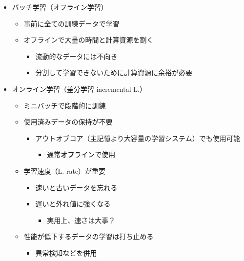\begin{itemize}
\tightlist
\item
  バッチ学習（オフライン学習）

  \begin{itemize}
  \tightlist
  \item
    事前に全ての訓練データで学習
  \item
    オフラインで大量の時間と計算資源を割く

    \begin{itemize}
    \tightlist
    \item
      流動的なデータには不向き
    \item
      分割して学習できないために計算資源に余裕が必要
    \end{itemize}
  \end{itemize}
\item
  オンライン学習（差分学習 incremental L.）

  \begin{itemize}
  \tightlist
  \item
    ミニバッチで段階的に訓練
  \item
    使用済みデータの保持が不要

    \begin{itemize}
    \tightlist
    \item
      アウトオブコア（主記憶より大容量の学習システム）でも使用可能

      \begin{itemize}
      \tightlist
      \item
        通常\textbf{オフ}ラインで使用
      \end{itemize}
    \end{itemize}
  \item
    学習速度（L. rate）が重要

    \begin{itemize}
    \tightlist
    \item
      速いと古いデータを忘れる
    \item
      遅いと外れ値に強くなる

      \begin{itemize}
      \tightlist
      \item
        実用上、速さは大事？
      \end{itemize}
    \end{itemize}
  \item
    性能が低下するデータの学習は打ち止める

    \begin{itemize}
    \tightlist
    \item
      異常検知などを併用
    \end{itemize}
  \end{itemize}
\end{itemize}

